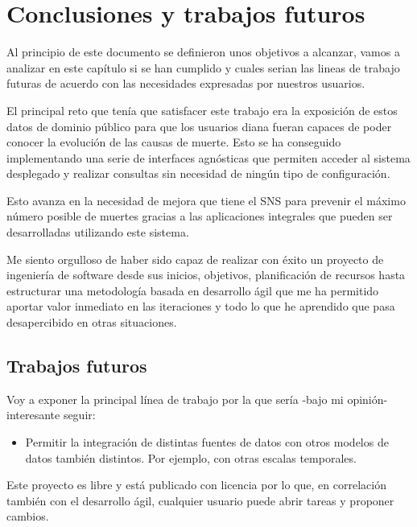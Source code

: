 \chapter{Conclusiones y trabajos futuros}
Al principio de este documento se definieron unos objetivos a alcanzar, vamos a analizar
en este capítulo si se han cumplido y cuales serian las lineas de trabajo futuras de
acuerdo con las necesidades expresadas por nuestros usuarios.

El principal reto que tenía que satisfacer este trabajo era la exposición de estos datos
de dominio público para que los usuarios diana fueran capaces de poder conocer la
evolución de las causas de muerte. Esto se ha conseguido implementando una serie de
interfaces agnósticas que permiten acceder al sistema desplegado y realizar consultas sin
necesidad de ningún tipo de configuración. 

Esto avanza en la necesidad de mejora que tiene el SNS para prevenir el máximo número
posible de muertes gracias a las aplicaciones integrales que pueden ser desarrolladas
utilizando este sistema.

Me siento orgulloso de haber sido capaz de realizar con éxito un proyecto de ingeniería de
software desde sus inicios, objetivos, planificación de recursos hasta estructurar una
metodología basada en desarrollo ágil que me ha permitido aportar valor inmediato en las
iteraciones y todo lo que he aprendido que pasa desapercibido en otras situaciones.

\section{Trabajos futuros}
Voy a exponer la principal línea de trabajo por la que sería -bajo mi opinión- interesante seguir:
\begin{itemize}
    \item Permitir la integración de distintas fuentes de datos con otros modelos de datos
    también distintos. Por ejemplo, con otras escalas temporales.
\end{itemize}
Este proyecto es libre y está publicado con licencia \cite{gplv3} por lo que, en
correlación también con el desarrollo ágil, cualquier usuario puede abrir tareas y
proponer cambios.